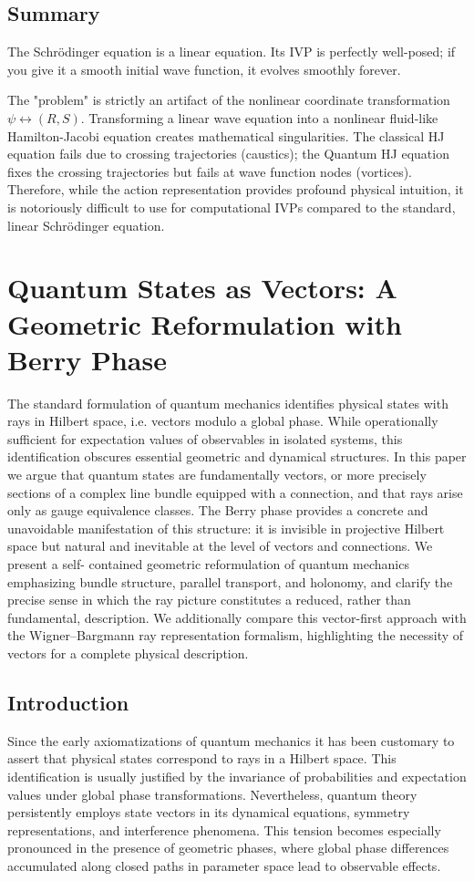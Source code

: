 \documentclass[11pt]{article}
\begin{document}
\subsection{Summary}
The Schrödinger equation is a linear equation. Its IVP is perfectly 
well-posed; if you give it a smooth initial wave function, it evolves
smoothly forever. 

The "problem" is strictly an artifact of the nonlinear coordinate
transformation $\psi \leftrightarrow (R, S)$. Transforming a linear wave
equation into a nonlinear fluid-like Hamilton-Jacobi equation creates
mathematical singularities. The classical HJ equation fails due to 
crossing trajectories (caustics); the Quantum HJ equation fixes the
crossing trajectories but fails at wave function nodes (vortices). 
Therefore, while the action representation provides profound physical
intuition, it is notoriously difficult to use for computational IVPs
compared to the standard, linear Schrödinger equation.

\section{Quantum States as Vectors: A Geometric Reformulation with Berry Phase}

The standard formulation of quantum mechanics identifies physical states
with rays in Hilbert space, i.e. vectors modulo a global phase. While
operationally sufficient for expectation values of observables in isolated
systems, this identification obscures essential geometric and dynamical
structures. In this paper we argue that quantum states are fundamentally 
vectors, or more precisely sections of a complex line bundle equipped with
a connection, and that rays arise only as gauge equivalence classes.
The Berry phase provides a concrete and unavoidable manifestation of this
structure: it is invisible in projective Hilbert space but natural and
inevitable at the level of vectors and connections. We present a self-
contained geometric reformulation of quantum mechanics emphasizing bundle
structure, parallel transport, and holonomy, and clarify the precise sense
in which the ray picture constitutes a reduced, rather than fundamental,
description. We additionally compare this vector-first approach with the
Wigner–Bargmann ray representation formalism, highlighting the necessity 
of vectors for a complete physical description.

\subsection{Introduction}
Since the early axiomatizations of quantum mechanics it has been customary
to assert that physical states correspond to rays in a Hilbert space. 
This identification is usually justified by the invariance of probabilities
and expectation values under global phase transformations. Nevertheless,
quantum theory persistently employs state vectors in its dynamical
equations, symmetry representations, and interference phenomena. This
tension becomes especially pronounced in the presence of geometric phases,
where global phase differences accumulated along closed paths in parameter
space lead to observable effects.
\end{document}
